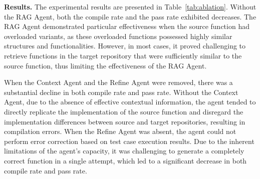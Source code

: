 \noindent\textbf{Results.} The experimental results are presented in Table~\ref{tab:ablation}. Without the RAG Agent, both the compile rate and the pass rate exhibited decreases. The RAG Agent demonstrated particular effectiveness when the source function had overloaded variants, as these overloaded functions possessed highly similar structures and functionalities. However, in most cases, it proved challenging to retrieve functions in the target repository that were sufficiently similar to the source function, thus limiting the effectiveness of the RAG Agent. 

When the Context Agent and the Refine Agent were removed, there was a substantial decline in both compile rate and pass rate. Without the Context Agent, due to the absence of effective contextual information, the agent tended to directly replicate the implementation of the source function and disregard the implementation differences between source and target repositories, resulting in compilation errors. When the Refine Agent was absent, the agent could not perform error correction based on test case execution results. Due to the inherent limitations of the agent's capacity, it was challenging to generate a completely correct function in a single attempt, which led to a significant decrease in both compile rate and pass rate.



